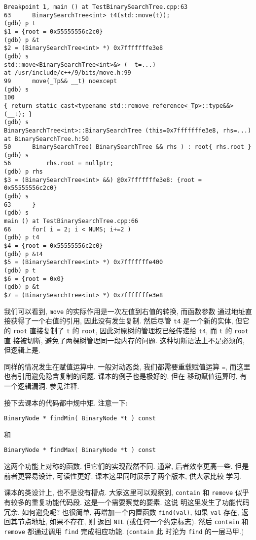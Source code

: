 \documentclass[a4paper]{ctexart}
\theoremstyle{definition}
\theoremstyle{definition}
\begin{document}
\begin{verbatim}
Breakpoint 1, main () at TestBinarySearchTree.cpp:63
63	    BinarySearchTree<int> t4(std::move(t));
(gdb) p t
$1 = {root = 0x55555556c2c0}
(gdb) p &t
$2 = (BinarySearchTree<int> *) 0x7fffffffe3e8
(gdb) s
std::move<BinarySearchTree<int>&> (__t=...) 
at /usr/include/c++/9/bits/move.h:99
99	    move(_Tp&& __t) noexcept
(gdb) s
100	    
{ return static_cast<typename std::remove_reference<_Tp>::type&&>(__t); }
(gdb) s
BinarySearchTree<int>::BinarySearchTree (this=0x7fffffffe3e8, rhs=...) 
at BinarySearchTree.h:50
50	    BinarySearchTree( BinarySearchTree && rhs ) : root{ rhs.root }
(gdb) s
56			rhs.root = nullptr;
(gdb) p rhs
$3 = (BinarySearchTree<int> &&) @0x7fffffffe3e8: {root = 0x55555556c2c0}
(gdb) s
63	    }
(gdb) s
main () at TestBinarySearchTree.cpp:66
66	    for( i = 2; i < NUMS; i+=2 )
(gdb) p t4
$4 = {root = 0x55555556c2c0}
(gdb) p &t4
$5 = (BinarySearchTree<int> *) 0x7fffffffe400
(gdb) p t
$6 = {root = 0x0}
(gdb) p &t
$7 = (BinarySearchTree<int> *) 0x7fffffffe3e8
\end{verbatim}

我们可以看到, \verb|move| 的实际作用是一次左值到右值的转换, 而函数参数
通过地址直接获得了一个右值的引用, 因此没有发生复制. 然后尽管 \verb|t4|
是一个新的实体, 但它的 \verb|root| 直接复制了 \verb|t| 的 \verb|root|,
因此对原树的管理权已经传递给 \verb|t4|, 而 \verb|t| 的 \verb|root| 直
接被切断, 避免了两棵树管理同一段内存的问题. 这种切断语法上不是必须的,
但逻辑上是.

同样的情况发生在赋值运算中. 一般对动态类, 我们都需要重载赋值运算
\verb|=|, 而这里也有引用避免隐含复制的问题. 课本的例子也是极好的. 但在
移动赋值运算时, 有一个逻辑漏洞. 参见注释.

接下去课本的代码都中规中矩. 注意一下:
\begin{verbatim}
BinaryNode * findMin( BinaryNode *t ) const
\end{verbatim}
和
\begin{verbatim}
BinaryNode * findMax( BinaryNode *t ) const
\end{verbatim}
这两个功能上对称的函数. 但它们的实现截然不同. 通常, 后者效率更高一些.
但是前者更容易设计, 可读性更好. 课本这里同时展示了两个版本, 供大家比较
学习.

课本的类设计上, 也不是没有槽点. 大家这里可以观察到, \verb|contain| 和
\verb|remove| 似乎有较多的重复功能代码段. 这是一个需要察觉的要素. 这说
明这里发生了功能代码冗余. 如何避免呢? 也很简单, 再增加一个内置函数
\verb|find(val)|, 如果 \verb|val| 存在, 返回其节点地址, 如果不存在, 则
返回 \verb|NIL| (或任何一个约定标志). 然后 \verb|contain| 和
\verb|remove| 都通过调用 \verb|find| 完成相应功能. (\verb|contain| 此
时沦为 \verb|find| 的一层马甲.)
\end{document}
